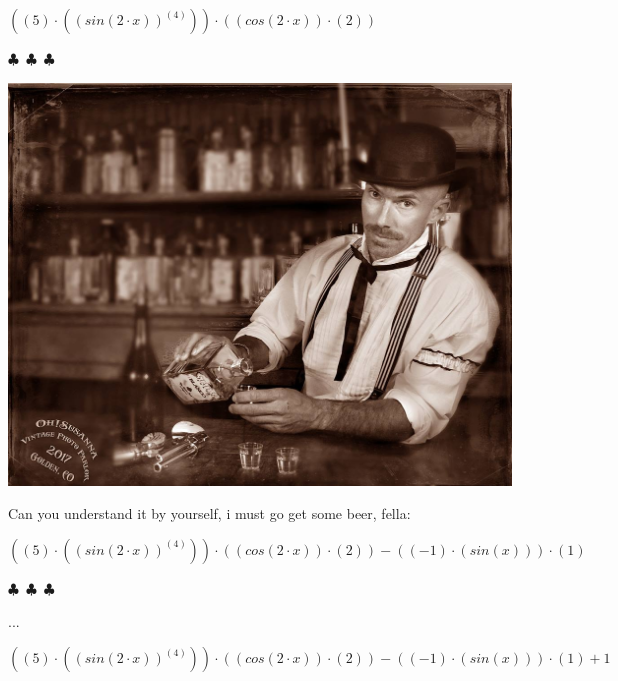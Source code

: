 \documentclass{article}
\begin{document}
\begin{center}$
{{({{({5})}\cdot{({{({sin{({{2}\cdot{x}})}})}^{({4})}})}})}\cdot{({{({cos{({{2}\cdot{x}})}})}\cdot{({2})}})}}
$\end{center}
\begin{center} $\clubsuit$~$\clubsuit$~$\clubsuit$ \end{center}\begin{center}  \includegraphics[scale=0.3]{funny_pics/bartender.jpg} \end{center}Can you understand it by yourself, i must go get some beer, fella:
\begin{center}$
{{{({{({5})}\cdot{({{({sin{({{2}\cdot{x}})}})}^{({4})}})}})}\cdot{({{({cos{({{2}\cdot{x}})}})}\cdot{({2})}})}}-{{({{({-1})}\cdot{({sin{({x})}})}})}\cdot{({1})}}}
$\end{center}
\begin{center} $\clubsuit$~$\clubsuit$~$\clubsuit$ \end{center}...
\begin{center}$
{{{{({{({5})}\cdot{({{({sin{({{2}\cdot{x}})}})}^{({4})}})}})}\cdot{({{({cos{({{2}\cdot{x}})}})}\cdot{({2})}})}}-{{({{({-1})}\cdot{({sin{({x})}})}})}\cdot{({1})}}}+{1}}
$\end{center}
\end{document}
